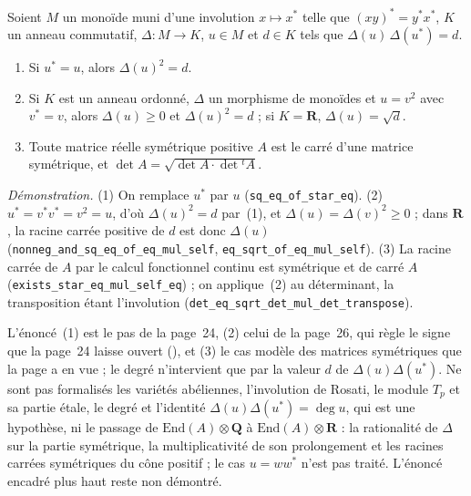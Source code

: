 \begin{encadre}
\begin{enonce}
Soient $M$ un monoïde muni d'une involution $x \mapsto x^*$ telle que $(xy)^* = y^*x^*$, $K$ un anneau commutatif, $\Delta : M \to K$, $u \in M$ et $d \in K$ tels que $\Delta(u)\,\Delta(u^*) = d$.
\begin{enumerate}
\item Si $u^* = u$, alors $\Delta(u)^2 = d$.
\item Si $K$ est un anneau ordonné, $\Delta$ un morphisme de monoïdes et $u = v^2$ avec $v^* = v$, alors $\Delta(u) \geq 0$ et $\Delta(u)^2 = d$ ; si $K = \mathbf R$, $\Delta(u) = \sqrt d$.
\item Toute matrice réelle symétrique positive $A$ est le carré d'une matrice symétrique, et $\det A = \sqrt{\det A \cdot \det {}^t\!A}$.
\end{enumerate}
\end{enonce}
\end{encadre}
{\small \emph{Démonstration.} (1) On remplace $u^*$ par $u$ (\texttt{sq\_eq\_of\_star\_eq}). (2) $u^* = v^* v^* = v^2 = u$, d'où $\Delta(u)^2 = d$ par~(1), et $\Delta(u) = \Delta(v)^2 \geq 0$ ; dans $\mathbf R$, la racine carrée positive de $d$ est donc $\Delta(u)$ (\texttt{nonneg\_and\_sq\_eq\_of\_eq\_mul\_self}, \texttt{eq\_sqrt\_of\_eq\_mul\_self}). (3) La racine carrée de $A$ par le calcul fonctionnel continu est symétrique et de carré $A$ (\texttt{exists\_star\_eq\_mul\_self\_eq}) ; on applique~(2) au déterminant, la transposition étant l'involution (\texttt{det\_eq\_sqrt\_det\_mul\_det\_transpose}).

L'énoncé~(1) est le pas de la page~24, (2) celui de la page~26, qui règle le signe que la page~24 laisse ouvert (), et (3) le cas modèle des matrices symétriques que la page a en vue ; le degré n'intervient que par la valeur $d$ de $\Delta(u)\Delta(u^*)$. Ne sont pas formalisés les variétés abéliennes, l'involution de Rosati, le module $T_p$ et sa partie étale, le degré et l'identité $\Delta(u)\Delta(u^*) = \deg u$, qui est une hypothèse, ni le passage de $\mathrm{End}(A) \otimes \mathbf Q$ à $\mathrm{End}(A) \otimes \mathbf R$ : la rationalité de $\Delta$ sur la partie symétrique, la multiplicativité de son prolongement et les racines carrées symétriques du cône positif ; le cas $u = ww^*$ n'est pas traité. L'énoncé encadré plus haut reste non démontré.\par}

